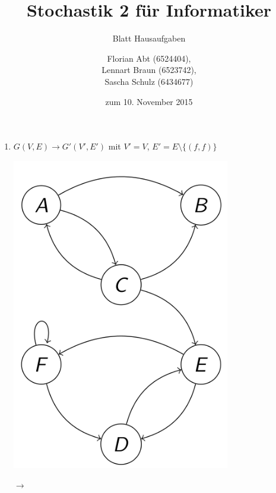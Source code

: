 \documentclass[a4paper]{scrartcl}
\title{Stochastik 2 für Informatiker}
\subtitle{Blatt {\blattnr} Hausaufgaben}
\author{
    Florian Abt (6524404), \\
    Lennart Braun (6523742), \\
    Sascha Schulz (6434677)
}
\date{zum 10. November 2015}
\def \blattnr {4}
\begin{document}
\maketitle

\begin{enumerate}[label=\bfseries \blattnr.\arabic*]
    \item
    $G(V,E) \to G'(V', E')$ mit $V' = V$, $E' = E\setminus\{(f,f)\}$

    \begin{minipage}{0.25\textwidth}
    \centering
    \includegraphics[width=0.75\textwidth]{assets/graph-vorher.png}     
    \end{minipage}
    \begin{minipage}{0.01\textwidth}
    \centering
    $\to$     
    \end{minipage}
    \begin{minipage}{0.24\textwidth}
     \centering

\end{minipage}
\end{enumerate}
\end{document}
